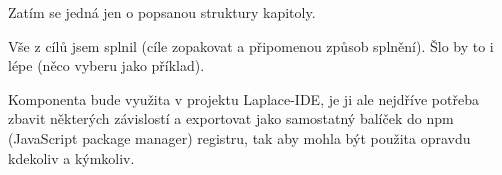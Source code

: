 
\begin{conclusion}
    Zatím se jedná jen o popsanou struktury kapitoly.

    Vše z cílů jsem splnil (cíle zopakovat a připomenou způsob splnění).
    Šlo by to i lépe (něco vyberu jako příklad).

    Komponenta bude využita v projektu Laplace-IDE, je ji ale nejdříve potřeba zbavit některých závislostí a exportovat jako samostatný balíček do npm (JavaScript package manager) registru, tak aby mohla být použita opravdu kdekoliv a kýmkoliv.

\end{conclusion}

